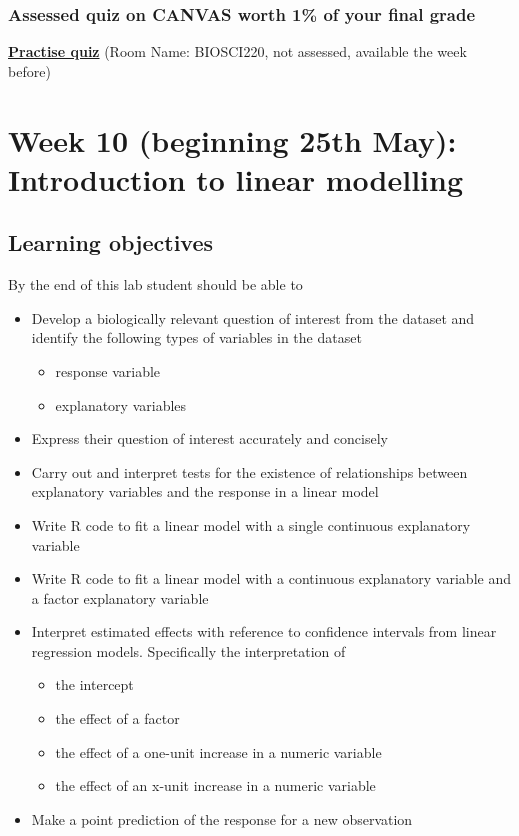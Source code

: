 \documentclass{article}
\begin{document}
\subsubsection*{Assessed quiz on CANVAS worth 1\% of your final grade}

\begin{center}
  \href{https://b.socrative.com/login/student/}{\textbf{\Large Practise quiz}} (Room Name: BIOSCI220, not assessed, available the week before)
  
\end{center}




\newpage

\section*{Week 10 (beginning 25th May): Introduction to linear modelling}
\subsection*{Learning objectives}
By the end of this lab student should be able to
\begin{itemize}
\item Develop a biologically relevant question of interest  from the dataset and identify the following types of variables in the dataset
  \begin{itemize}
  \item response variable
  \item explanatory variables
  \end{itemize}
\item Express their question of interest accurately and concisely
\item Carry out and interpret tests for the existence of relationships between explanatory variables and the response in a linear model
\item Write R code to fit a linear model with a single continuous explanatory variable
\item Write R code to fit a linear model with a continuous explanatory variable and a factor explanatory variable
\item Interpret estimated effects with reference to confidence intervals from linear regression models. Specifically the interpretation of
  \begin{itemize}
  \item the intercept
  \item the effect of a factor
  \item the effect of a one-unit increase in a numeric variable
  \item the effect of an x-unit increase in a numeric variable
  \end{itemize}
\item Make a point prediction of the response for a new observation
\end{itemize}
\end{document}
